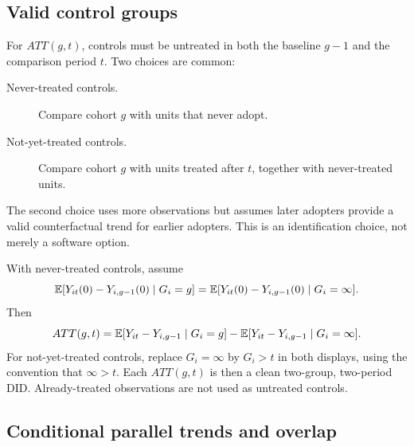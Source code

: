 \subsection{Valid control groups}

For $ATT(g,t)$, controls must be untreated in both the baseline $g-1$ and the
comparison period $t$.  Two choices are common:
\begin{description}
  \item[Never-treated controls.] Compare cohort $g$ with units that never adopt.
  \item[Not-yet-treated controls.] Compare cohort $g$ with units treated after
  $t$, together with never-treated units.
\end{description}
The second choice uses more observations but assumes later adopters provide a
valid counterfactual trend for earlier adopters.  This is an identification
choice, not merely a software option.

With never-treated controls, assume
\begin{equation}
  \mathbb{E}[Y_{it}(0)-Y_{i,g-1}(0)\mid G_i=g]
  =\mathbb{E}[Y_{it}(0)-Y_{i,g-1}(0)\mid G_i=\infty].
  \label{eq:did-pt-never}
\end{equation}
Then
\begin{equation}
  ATT(g,t)=
  \mathbb{E}[Y_{it}-Y_{i,g-1}\mid G_i=g]
  -\mathbb{E}[Y_{it}-Y_{i,g-1}\mid G_i=\infty].
  \label{eq:did-id-never}
\end{equation}
For not-yet-treated controls, replace $G_i=\infty$ by $G_i>t$ in both displays,
using the convention that $\infty>t$.  Each $ATT(g,t)$ is then a clean
two-group, two-period DID.  Already-treated observations are not used as
untreated controls.

\subsection{Conditional parallel trends and overlap}

